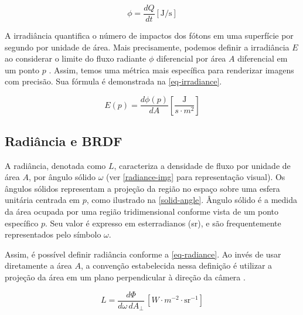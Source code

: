 \documentclass[english, 
               brazil, 
               bsc] %
               {dcomp-abntex2}
\begin{document}
\begin{equation} \label{eq-fluxo-radiante}
  \phi = \frac{dQ}{dt} \left[\text{J/s}\right] 
\end{equation}


A irradiância quantifica o número de impactos dos fótons em uma superfície por segundo por unidade de área. Mais precisamente, podemos definir a irradiância $E$ ao considerar o limite do fluxo radiante $\phi$ diferencial por área $A$ diferencial em um ponto $p$ \cite[~5.4.1]{pbr}. Assim, temos uma métrica mais específica para renderizar imagens com precisão. Sua fórmula é demonstrada na \autoref{eq-irradiance}.


\begin{equation} \label{eq-irradiance}
 E(p) = \frac{d\phi(p)}{dA} \left[ \frac{\text{J}} {s\cdot m^2} \right]
\end{equation}




\subsection{Radiância e BRDF} \label{brdf}


A radiância,  denotada como \( L \), caracteriza a densidade de fluxo por unidade de área \( A \), por ângulo sólido \(\omega \) (ver \autoref{radiance-img} para representação visual). Os ângulos sólidos representam a projeção da região no espaço sobre uma esfera unitária centrada em \( p \), como ilustrado na \autoref{solid-angle}. Ângulo sólido é a medida da área ocupada por uma região tridimensional conforme vista de um ponto específico \( p \). Seu valor é expresso em esterradianos (sr), e são frequentemente representados pelo símbolo \( \omega \).


Assim, é possível definir radiância conforme a \autoref{eq-radiance}. Ao invés de usar diretamente a área \( A \), a convenção estabelecida nessa definição é utilizar a projeção da área em um plano perpendicular à direção da câmera \cite{weyrich}.


\begin{equation} \label{eq-radiance}
  L = \frac{d\Phi}{d\omega \, dA_\perp} \, \left[W \cdot m^{-2} \cdot \text{sr}^{-1}\right]
\end{equation}
\end{document}
